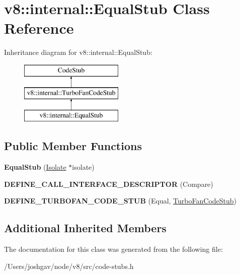 \hypertarget{classv8_1_1internal_1_1_equal_stub}{}\section{v8\+:\+:internal\+:\+:Equal\+Stub Class Reference}
\label{classv8_1_1internal_1_1_equal_stub}
Inheritance diagram for v8\+:\+:internal\+:\+:Equal\+Stub\+:\begin{figure}[H]
\begin{center}
\leavevmode
\includegraphics[height=3.000000cm]{classv8_1_1internal_1_1_equal_stub}
\end{center}
\end{figure}
\subsection*{Public Member Functions}
\begin{DoxyCompactItemize}
\item 
{\bfseries Equal\+Stub} (\hyperlink{classv8_1_1internal_1_1_isolate}{Isolate} $\ast$isolate)\hypertarget{classv8_1_1internal_1_1_equal_stub_a8957f193de4b5370f3c70b4f2e6d35e3}{}\label{classv8_1_1internal_1_1_equal_stub_a8957f193de4b5370f3c70b4f2e6d35e3}

\item 
{\bfseries D\+E\+F\+I\+N\+E\+\_\+\+C\+A\+L\+L\+\_\+\+I\+N\+T\+E\+R\+F\+A\+C\+E\+\_\+\+D\+E\+S\+C\+R\+I\+P\+T\+OR} (Compare)\hypertarget{classv8_1_1internal_1_1_equal_stub_a38658cf5ce50041ed92dc4465326021b}{}\label{classv8_1_1internal_1_1_equal_stub_a38658cf5ce50041ed92dc4465326021b}

\item 
{\bfseries D\+E\+F\+I\+N\+E\+\_\+\+T\+U\+R\+B\+O\+F\+A\+N\+\_\+\+C\+O\+D\+E\+\_\+\+S\+T\+UB} (Equal, \hyperlink{classv8_1_1internal_1_1_turbo_fan_code_stub}{Turbo\+Fan\+Code\+Stub})\hypertarget{classv8_1_1internal_1_1_equal_stub_ad2c7fa69f16e8909b884f9fbe7e85499}{}\label{classv8_1_1internal_1_1_equal_stub_ad2c7fa69f16e8909b884f9fbe7e85499}

\end{DoxyCompactItemize}
\subsection*{Additional Inherited Members}


The documentation for this class was generated from the following file\+:\begin{DoxyCompactItemize}
\item 
/\+Users/joshgav/node/v8/src/code-\/stubs.\+h\end{DoxyCompactItemize}
